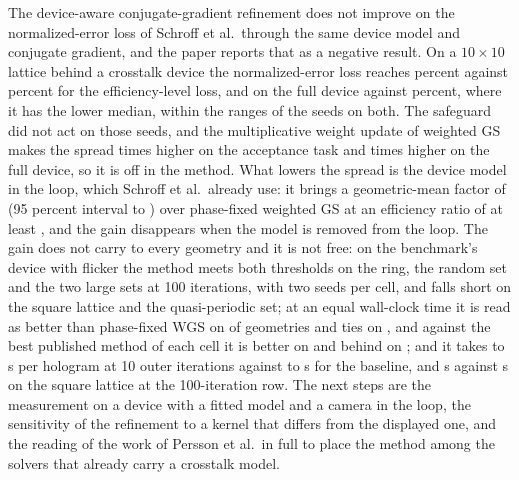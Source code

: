 The device-aware conjugate-gradient refinement does not improve on the normalized-error loss of Schroff et al.\ through the same device model and conjugate gradient, and the paper reports that as a negative result. On a $10\times10$ lattice behind a crosstalk device the normalized-error loss reaches \schroffXSig{} percent against \ablBFullSig{} percent for the efficiency-level loss, and on the full device \schroffFSig{} against \ablBFFullSig{} percent, where it has the lower median, within the ranges of the seeds on both. The safeguard did not act on those seeds, and the multiplicative weight update of weighted GS makes the spread \ablBWeightsRatio{} times higher on the acceptance task and \ablBFWeightsRatio{} times higher on the full device, so it is off in the method. What lowers the spread is the device model in the loop, which Schroff et al.\ already use: it brings a geometric-mean factor of \ratioOneGm{} (95 percent interval \ratioOneCiLo{} to \ratioOneCiHi{}) over phase-fixed weighted GS at an efficiency ratio of at least \effRatioOneMin{}, and the gain disappears when the model is removed from the loop. The gain does not carry to every geometry and it is not free: on the benchmark's device with flicker the method meets both thresholds on the ring, the random set and the two large sets at 100 iterations, with two seeds per cell, and falls short on the square lattice and the quasi-periodic set; at an equal wall-clock time it is read as better than phase-fixed WGS on \benchOneDevTimeProposed{} of \benchOneDevCells{} geometries and ties on \benchOneDevTimeTie{}, and against the best published method of each cell it is better on \benchAllRefWins{} and behind on \benchAllPubWins{}; and it takes \benchTenSecRefMin{} to \benchTenSecRefMax{} s per hologram at 10 outer iterations against \benchTenSecMsevenMin{} to \benchTenSecMsevenMax{} s for the baseline, and \benchSecGeoOneBOne{} s against \benchSecGeoOneMseven{} s on the square lattice at the 100-iteration row.
The next steps are the measurement on a device with a fitted model and a camera in the loop, the sensitivity of the refinement to a kernel that differs from the displayed one, and the reading of the work of Persson et al.\ in full to place the method among the solvers that already carry a crosstalk model.
